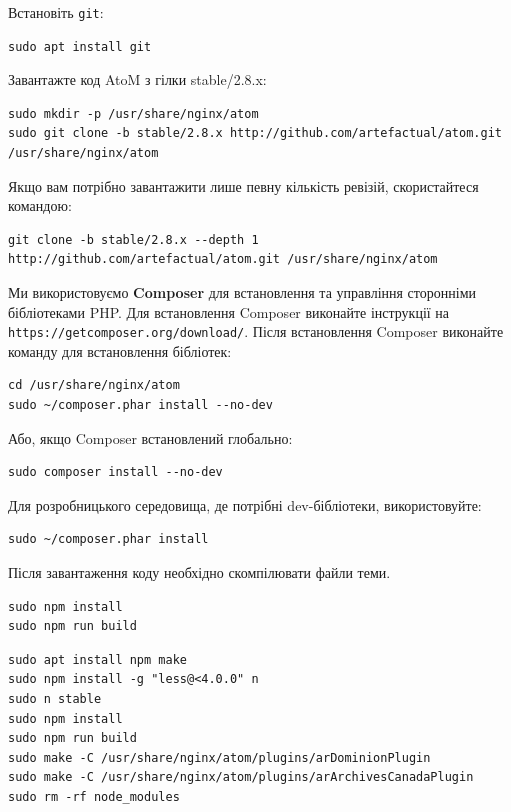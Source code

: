 \documentclass[14pt,a4paper]{article}
\begin{document}
\begin{large}
Встановіть \texttt{git}:

\begin{lstlisting}
sudo apt install git
\end{lstlisting}

Завантажте код AtoM з гілки stable/2.8.x:

\begin{lstlisting}
sudo mkdir -p /usr/share/nginx/atom
sudo git clone -b stable/2.8.x http://github.com/artefactual/atom.git /usr/share/nginx/atom
\end{lstlisting}

Якщо вам потрібно завантажити лише певну кількість ревізій, скористайтеся командою:

\begin{lstlisting}
git clone -b stable/2.8.x --depth 1 http://github.com/artefactual/atom.git /usr/share/nginx/atom
\end{lstlisting}


Ми використовуємо \textbf{Composer} для встановлення та управління сторонніми бібліотеками PHP. Для встановлення Composer виконайте інструкції на \texttt{https://getcomposer.org/download/}. Після встановлення Composer виконайте команду для встановлення бібліотек:

\begin{lstlisting}
cd /usr/share/nginx/atom
sudo ~/composer.phar install --no-dev
\end{lstlisting}

Або, якщо Composer встановлений глобально:

\begin{lstlisting}
sudo composer install --no-dev
\end{lstlisting}

Для розробницького середовища, де потрібні dev-бібліотеки, використовуйте:

\begin{lstlisting}
sudo ~/composer.phar install
\end{lstlisting}


Після завантаження коду необхідно скомпілювати файли теми.


\begin{lstlisting}
sudo npm install
sudo npm run build
\end{lstlisting}


\begin{lstlisting}
sudo apt install npm make
sudo npm install -g "less@<4.0.0" n
sudo n stable
sudo npm install
sudo npm run build
sudo make -C /usr/share/nginx/atom/plugins/arDominionPlugin
sudo make -C /usr/share/nginx/atom/plugins/arArchivesCanadaPlugin
sudo rm -rf node_modules
\end{lstlisting}


\end{large}
\end{document}
